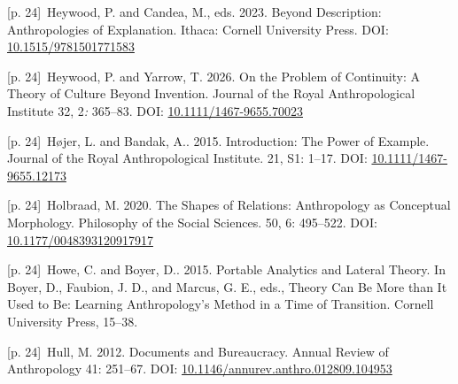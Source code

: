 \documentclass[10pt,a4paper]{article}
\begin{document}
\noindent\begin{minipage}[t]{\linewidth}{\scriptsize\color{gray} [p. 24]}\ Heywood, P. and Candea, M., eds. 2023. Beyond Description: Anthropologies of Explanation. Ithaca: Cornell University Press. DOI: \url{10.1515/9781501771583}\par\end{minipage}\par
\noindent\begin{minipage}[t]{\linewidth}{\scriptsize\color{gray} [p. 24]}\ Heywood, P. and Yarrow, T. 2026. On the Problem of Continuity: A Theory of Culture Beyond Invention. Journal of the Royal Anthropological Institute 32, 2\textit{:} 365–83. DOI: \url{10.1111/1467-9655.70023}\par\end{minipage}\par
\noindent\begin{minipage}[t]{\linewidth}{\scriptsize\color{gray} [p. 24]}\ Højer, L. and Bandak, A.. 2015. Introduction: The Power of Example. Journal of the Royal Anthropological Institute. 21, S1: 1–17. DOI: \url{10.1111/1467-9655.12173}\par\end{minipage}\par
\noindent\begin{minipage}[t]{\linewidth}{\scriptsize\color{gray} [p. 24]}\ Holbraad, M. 2020. The Shapes of Relations: Anthropology as Conceptual Morphology. Philosophy of the Social Sciences. 50, 6: 495–522. DOI: \url{10.1177/0048393120917917}\par\end{minipage}\par
\noindent\begin{minipage}[t]{\linewidth}{\scriptsize\color{gray} [p. 24]}\ Howe, C. and Boyer, D.. 2015. Portable Analytics and Lateral Theory. In Boyer, D., Faubion, J. D., and Marcus, G. E., eds., Theory Can Be More than It Used to Be: Learning Anthropology’s Method in a Time of Transition. Cornell University Press, 15–38.\par\end{minipage}\par
\noindent\begin{minipage}[t]{\linewidth}{\scriptsize\color{gray} [p. 24]}\ Hull, M. 2012. Documents and Bureaucracy. Annual Review of Anthropology 41: 251–67. DOI: \url{10.1146/annurev.anthro.012809.104953}\par\end{minipage}\par
\end{document}
